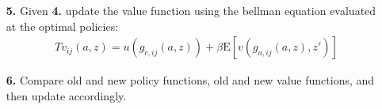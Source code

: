 \documentclass[12pt,pdftex]{article}
\begin{document}
\begin{onehalfspacing}
\begin{itemize}
\item[\textbf{5.}] Given \textbf{4.} update the value function using the bellman equation evaluated at the optimal policies:
\begin{align}
Tv_{ij}(a, z) = u(g_{c,ij}(a,z)) + \beta \mathrm{E}\left[ v(g_{a,ij}(a,z), z') \right]
\end{align}

\item[\textbf{6.}] Compare old and new policy functions, old and new value functions, and then update accordingly.


%
\end{itemize}



\newpage



\end{onehalfspacing}
\end{document}
